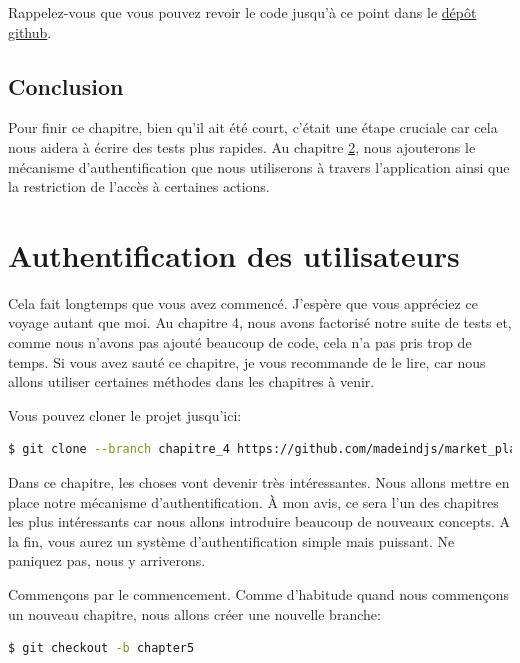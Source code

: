 \documentclass[]{report}
\begin{document}
    Rappelez-vous que vous pouvez revoir le code jusqu'à ce point dans le \href{https://github.com/madeindjs/market_place_api}{dépôt github}.

  \section{Conclusion}

    Pour finir ce chapitre, bien qu'il ait été court, c'était une étape cruciale car cela nous aidera à écrire des tests plus rapides. Au chapitre \ref{chapter:5}, nous ajouterons le mécanisme d'authentification que nous utiliserons à travers l'application ainsi que la restriction de l'accès à certaines actions.

\chapter{Authentification des utilisateurs}\label{chapter:5}

  Cela fait longtemps que vous avez commencé. J'espère que vous appréciez ce voyage autant que moi. Au chapitre 4, nous avons factorisé notre suite de tests et, comme nous n'avons pas ajouté beaucoup de code, cela n'a pas pris trop de temps. Si vous avez sauté ce chapitre, je vous recommande de le lire, car nous allons utiliser certaines méthodes dans les chapitres à venir.

  Vous pouvez cloner le projet jusqu'ici:

  \begin{scriptsize}
    \begin{lstlisting}[language=bash]
    $ git clone --branch chapitre_4 https://github.com/madeindjs/market_place_api
    \end{lstlisting}
  \end{scriptsize}

  Dans ce chapitre, les choses vont devenir très intéressantes. Nous allons mettre en place notre mécanisme d'authentification. À mon avis, ce sera l'un des chapitres les plus intéressants car nous allons introduire beaucoup de nouveaux concepts. A la fin, vous aurez un système d'authentification simple mais puissant. Ne paniquez pas, nous y arriverons.

  Commençons par le commencement. Comme d'habitude quand nous commençons un nouveau chapitre, nous allons créer une nouvelle branche:

  \begin{scriptsize}
    \begin{lstlisting}[language=bash]
    $ git checkout -b chapter5
    \end{lstlisting}
  \end{scriptsize}
\end{document}
